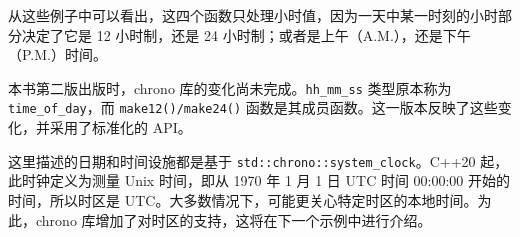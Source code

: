 从这些例子中可以看出，这四个函数只处理小时值，因为一天中某一时刻的小时部分决定了它是 12 小时制，还是 24 小时制；或者是上午（A.M.），还是下午（P.M.）时间。

\begin{myNotic}
本书第二版出版时，chrono 库的变化尚未完成。\verb|hh_mm_ss| 类型原本称为 \verb|time_of_day|，而 \verb|make12()/make24()| 函数是其成员函数。这一版本反映了这些变化，并采用了标准化的 API。
\end{myNotic}


这里描述的日期和时间设施都是基于 \verb|std::chrono::system_clock|。C++20 起，此时钟定义为测量 Unix 时间，即从 1970 年 1 月 1 日 UTC 时间 00:00:00 开始的时间，所以时区是 UTC。大多数情况下，可能更关心特定时区的本地时间。为此，chrono 库增加了对时区的支持，这将在下一个示例中进行介绍。
